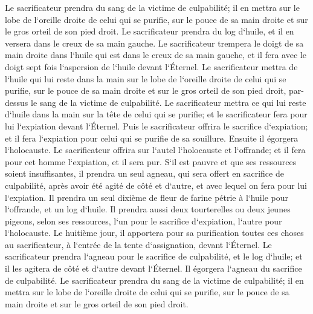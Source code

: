 \verse Le sacrificateur prendra du sang de la victime de culpabilité; il en mettra sur le lobe de l`oreille droite de celui qui se purifie, sur le pouce de sa main droite et sur le gros orteil de son pied droit. 
\verse Le sacrificateur prendra du log d`huile, et il en versera dans le creux de sa main gauche. 
\verse Le sacrificateur trempera le doigt de sa main droite dans l`huile qui est dans le creux de sa main gauche, et il fera avec le doigt sept fois l`aspersion de l`huile devant l`Éternel. 
\verse Le sacrificateur mettra de l`huile qui lui reste dans la main sur le lobe de l`oreille droite de celui qui se purifie, sur le pouce de sa main droite et sur le gros orteil de son pied droit, par-dessus le sang de la victime de culpabilité. 
\verse Le sacrificateur mettra ce qui lui reste d`huile dans la main sur la tête de celui qui se purifie; et le sacrificateur fera pour lui l`expiation devant l`Éternel. 
\verse Puis le sacrificateur offrira le sacrifice d`expiation; et il fera l`expiation pour celui qui se purifie de sa souillure. 
\verse Ensuite il égorgera l`holocauste. Le sacrificateur offrira sur l`autel l`holocauste et l`offrande; et il fera pour cet homme l`expiation, et il sera pur. 
\verse S`il est pauvre et que ses ressources soient insuffisantes, il prendra un seul agneau, qui sera offert en sacrifice de culpabilité, après avoir été agité de côté et d`autre, et avec lequel on fera pour lui l`expiation. Il prendra un seul dixième de fleur de farine pétrie à l`huile pour l`offrande, et un log d`huile. 
\verse Il prendra aussi deux tourterelles ou deux jeunes pigeons, selon ses ressources, l`un pour le sacrifice d`expiation, l`autre pour l`holocauste. 
\verse Le huitième jour, il apportera pour sa purification toutes ces choses au sacrificateur, à l`entrée de la tente d`assignation, devant l`Éternel. 
\verse Le sacrificateur prendra l`agneau pour le sacrifice de culpabilité, et le log d`huile; et il les agitera de côté et d`autre devant l`Éternel. 
\verse Il égorgera l`agneau du sacrifice de culpabilité. Le sacrificateur prendra du sang de la victime de culpabilité; il en mettra sur le lobe de l`oreille droite de celui qui se purifie, sur le pouce de sa main droite et sur le gros orteil de son pied droit. 
